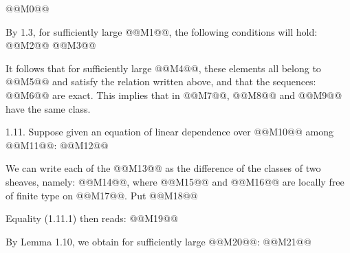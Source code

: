 @@M0@@

By 1.3, for sufficiently large @@M1@@, the following conditions will hold:
@@M2@@
@@M3@@

It follows that for sufficiently large @@M4@@, these elements all belong to @@M5@@ and satisfy the relation written above, and that the sequences:
@@M6@@
are exact. This implies that in @@M7@@, @@M8@@ and @@M9@@ have the same class.

1.11. Suppose given an equation of linear dependence over @@M10@@ among @@M11@@:
@@M12@@

We can write each of the @@M13@@ as the difference of the classes of two sheaves, namely: @@M14@@, where @@M15@@ and @@M16@@ are locally free of finite type on @@M17@@. Put
@@M18@@

Equality (1.11.1) then reads:
@@M19@@

By Lemma 1.10, we obtain for sufficiently large @@M20@@:
@@M21@@

